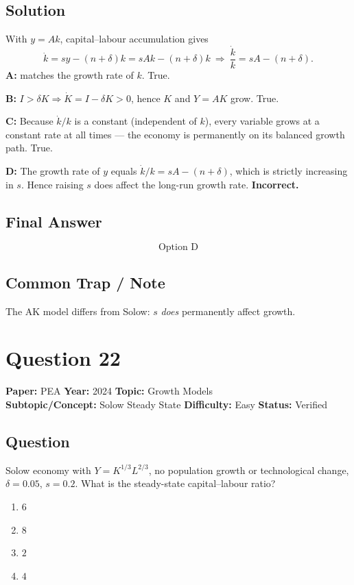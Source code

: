 \documentclass[11pt]{article}
\begin{document}
\subsection*{Solution}
With $y=Ak$, capital--labour accumulation gives
\[
\dot k = sy - (n+\delta)k = sAk - (n+\delta)k\ \Longrightarrow\ \frac{\dot k}{k}=sA-(n+\delta).
\]
\textbf{A:} matches the growth rate of $k$. True.

\textbf{B:} $I>\delta K\Rightarrow\dot K=I-\delta K>0$, hence $K$ and $Y=AK$ grow. True.

\textbf{C:} Because $\dot k/k$ is a constant (independent of $k$), every variable grows at a constant rate at all times --- the economy is permanently on its balanced growth path. True.

\textbf{D:} The growth rate of $y$ equals $\dot k/k=sA-(n+\delta)$, which is strictly increasing in $s$. Hence raising $s$ does affect the long-run growth rate. \textbf{Incorrect.}

\subsection*{Final Answer}
\[
\boxed{\text{Option D}}
\]

\subsection*{Common Trap / Note}
The AK model differs from Solow: $s$ \emph{does} permanently affect growth.

\section*{Question 22}
\textbf{Paper:} PEA \quad \textbf{Year:} 2024 \quad \textbf{Topic:} Growth Models \\
\textbf{Subtopic/Concept:} Solow Steady State \quad \textbf{Difficulty:} Easy \quad \textbf{Status:} Verified

\subsection*{Question}
Solow economy with $Y=K^{1/3}L^{2/3}$, no population growth or technological change, $\delta=0.05$, $s=0.2$. What is the steady-state capital--labour ratio?
\begin{enumerate}[label=(\Alph*)]
\item $6$
\item $8$
\item $2$
\item $4$
\end{enumerate}
\end{document}
